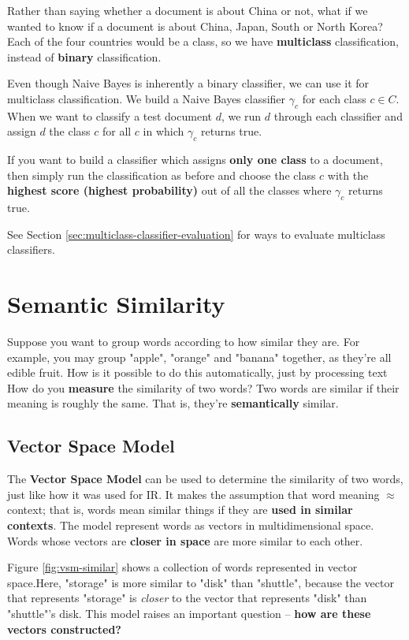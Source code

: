 \documentclass{article}
\begin{document}
Rather than saying whether a document is about China or not, what if we wanted to know if a document is about China, Japan, South or North Korea? Each of the four countries would be a class, so we have \textbf{multiclass} classification, instead of \textbf{binary} classification.

Even though Naive Bayes is inherently a binary classifier, we can use it for multiclass classification. We build a Naive Bayes classifier $\gamma_c$ for each class $c \in C$. When we want to classify a test document $d$, we run $d$ through each classifier and assign $d$ the class $c$ for all $c$ in which $\gamma_c$ returns true.

If you want to build a classifier which assigns \textbf{only one class} to a document, then simply run the classification as before and choose the class $c$ with the \textbf{highest score (highest probability)} out of all the classes where $\gamma_c$ returns true.

See Section \ref{sec:multiclass-classifier-evaluation} for ways to evaluate multiclass classifiers.

\section{Semantic Similarity}

Suppose you want to group words according to how similar they are. For example, you may group "apple", "orange" and "banana" together, as they're all edible fruit. How is it possible to do this automatically, just by processing text How do you \textbf{measure} the similarity of two words? Two words are similar if their meaning is roughly the same. That is, they're \textbf{semantically} similar.

\subsection{Vector Space Model}

The \textbf{Vector Space Model} can be used to determine the similarity of two words, just like how it was used for IR. It makes the assumption that word meaning $\approx$ context; that is, words mean similar things if they are \textbf{used in similar contexts}. The model represent words as vectors in multidimensional space. Words whose vectors are \textbf{closer in space} are more similar to each other.

Figure \ref{fig:vsm-similar} shows a collection of words represented in vector space.Here, "storage" is more similar to "disk" than "shuttle", because the vector that represents "storage" is \textit{closer} to the vector that represents "disk" than "shuttle"'s disk. This model raises an important question -- \textbf{how are these vectors constructed?}
\end{document}
